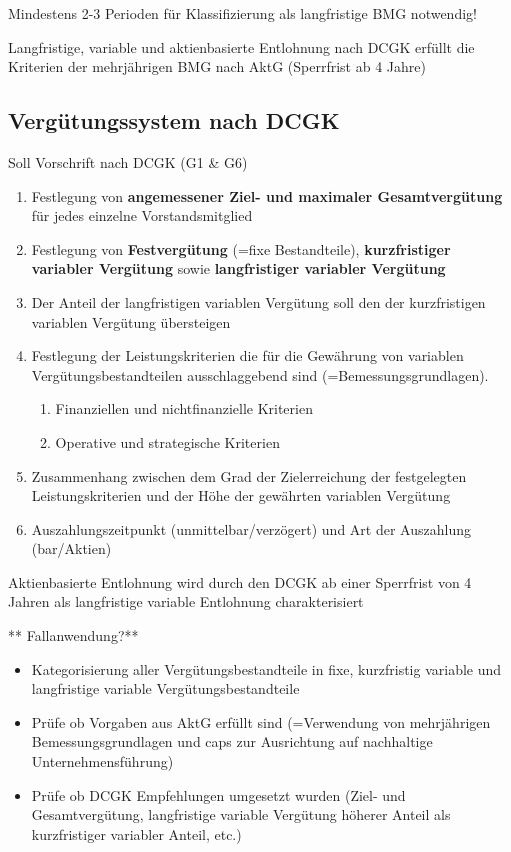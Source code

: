 \documentclass[
]{article}
\providecommand{\tightlist}{%
  \setlength{\itemsep}{0pt}\setlength{\parskip}{0pt}}
\begin{document}
Mindestens 2-3 Perioden für Klassifizierung als langfristige BMG
notwendig!

Langfristige, variable und aktienbasierte Entlohnung nach DCGK erfüllt
die Kriterien der mehrjährigen BMG nach AktG (Sperrfrist ab 4 Jahre)

\hypertarget{verguxfctungssystem-nach-dcgk}{%
\subsection{Vergütungssystem nach
DCGK}\label{verguxfctungssystem-nach-dcgk}}

Soll Vorschrift nach DCGK (G1 \& G6)

\begin{enumerate}
\def\labelenumi{\arabic{enumi}.}
\item
  Festlegung von \textbf{angemessener Ziel- und maximaler
  Gesamtvergütung} für jedes einzelne Vorstandsmitglied
\item
  Festlegung von \textbf{Festvergütung} (=fixe Bestandteile),
  \textbf{kurzfristiger variabler Vergütung} sowie \textbf{langfristiger
  variabler Vergütung}
\item
  Der Anteil der langfristigen variablen Vergütung soll den der
  kurzfristigen variablen Vergütung übersteigen
\item
  Festlegung der Leistungskriterien die für die Gewährung von variablen
  Vergütungsbestandteilen ausschlaggebend sind (=Bemessungsgrundlagen).

  \begin{enumerate}
  \def\labelenumii{\alph{enumii}.}
  \tightlist
  \item
    Finanziellen und nichtfinanzielle Kriterien
  \item
    Operative und strategische Kriterien
  \end{enumerate}
\item
  Zusammenhang zwischen dem Grad der Zielerreichung der festgelegten
  Leistungskriterien und der Höhe der gewährten variablen Vergütung
\item
  Auszahlungszeitpunkt (unmittelbar/verzögert) und Art der Auszahlung
  (bar/Aktien)
\end{enumerate}

Aktienbasierte Entlohnung wird durch den DCGK ab einer Sperrfrist von 4
Jahren als langfristige variable Entlohnung charakterisiert

** Fallanwendung?**

\begin{itemize}
\tightlist
\item
  Kategorisierung aller Vergütungsbestandteile in fixe, kurzfristig
  variable und langfristige variable Vergütungsbestandteile
\item
  Prüfe ob Vorgaben aus AktG erfüllt sind (=Verwendung von mehrjährigen
  Bemessungsgrundlagen und caps zur Ausrichtung auf nachhaltige
  Unternehmensführung)
\item
  Prüfe ob DCGK Empfehlungen umgesetzt wurden (Ziel- und
  Gesamtvergütung, langfristige variable Vergütung höherer Anteil als
  kurzfristiger variabler Anteil, etc.)
\end{itemize}
\end{document}
